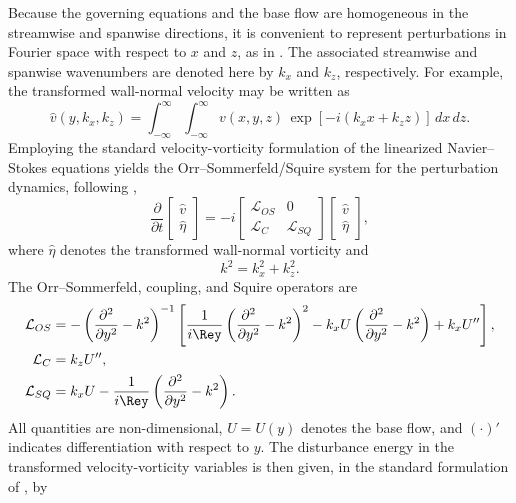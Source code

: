 \begin{appendices}
Because the governing equations and the base flow are homogeneous in the streamwise and spanwise directions, it is convenient to represent perturbations in Fourier space with respect to \(x\) and \(z\), as in \citet{schmid-henningson-2001}. The associated streamwise and spanwise wavenumbers are denoted here by \(k_x\) and \(k_z\), respectively. For example, the transformed wall-normal velocity may be written as
\begin{equation}
  \hat{v}(y,k_x,k_z)
  =
  \int_{-\infty}^{\infty}
  \int_{-\infty}^{\infty}
  v(x,y,z)\,
  \exp\!\left[-i(k_x x+k_z z)\right]
  \,dx\,dz.
\end{equation}
Employing the standard velocity-vorticity formulation of the linearized Navier--Stokes equations yields the Orr--Sommerfeld/Squire system for the perturbation dynamics, following \citet{schmid-henningson-2001},
\begin{equation}
  \frac{\partial}{\partial t}
  \begin{bmatrix}
    \hat{v}\\
    \hat{\eta}
  \end{bmatrix}
  =
  -i
  \begin{bmatrix}
    \mathcal{L}_{OS} & 0\\
    \mathcal{L}_{C} & \mathcal{L}_{SQ}
  \end{bmatrix}
  \begin{bmatrix}
    \hat{v}\\
    \hat{\eta}
  \end{bmatrix},
\end{equation}
where \(\hat{\eta}\) denotes the transformed wall-normal vorticity and
\begin{equation}
  k^2 = k_x^2 + k_z^2.
\end{equation}
The Orr--Sommerfeld, coupling, and Squire operators are
\begin{align}
  \mathcal{L}_{OS}
  &=
  -\left(
    \frac{\partial^2}{\partial y^2}-k^2
  \right)^{-1}
  \left[
    \frac{1}{i\Rey}
    \left(
      \frac{\partial^2}{\partial y^2}-k^2
    \right)^2
    - k_x U
    \left(
      \frac{\partial^2}{\partial y^2}-k^2
    \right)
    + k_x U''
  \right], \\
  \mathcal{L}_{C}
  &= k_z U'', \\
  \mathcal{L}_{SQ}
  &= k_x U - \frac{1}{i\Rey}
  \left(
    \frac{\partial^2}{\partial y^2}-k^2
  \right).
\end{align}
All quantities are non-dimensional, \(U=U(y)\) denotes the base flow, and \((\cdot)'\) indicates differentiation with respect to \(y\). The disturbance energy in the transformed velocity-vorticity variables is then given, in the standard formulation of \citet{schmid-henningson-2001}, by

\end{appendices}
